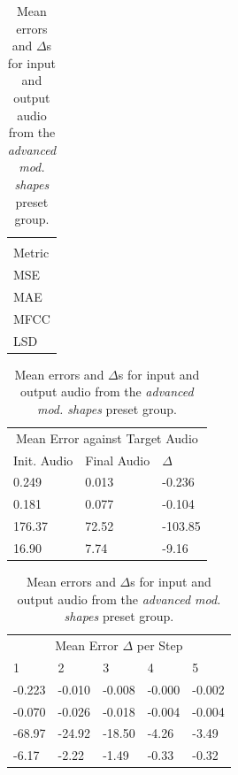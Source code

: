 \documentclass{article}
\begin{document}
\bigskip
\bigskip

\begin{table}[h]
  \caption{Mean errors and $\Delta$s for input and output audio from the \emph{advanced mod. shapes} preset group.}
  \centering
  \begin{tabular}{l}
    \toprule
    \multicolumn{1}{c}{} \\
    \cmidrule(r){1-1}
    Metric \\
    \midrule
    MSE \\
    MAE \\
    MFCC \\
    LSD \\
    \bottomrule
  \end{tabular}
  \begin{tabular}{lll}
    \toprule
    \multicolumn{3}{c}{Mean Error against Target Audio} \\
    \cmidrule(r){1-3}
    Init. Audio & Final Audio & $\Delta$ \\
    \midrule
    0.249 & 0.013 & -0.236 \\
    0.181 & 0.077 & -0.104 \\
    176.37 & 72.52 & -103.85 \\
    16.90 & 7.74 & -9.16 \\
    \bottomrule
  \end{tabular}
  \begin{tabular}{lllll}
    \toprule
    \multicolumn{5}{c}{Mean Error $\Delta$ per Step} \\
    \cmidrule(r){1-5}
    1 & 2 & 3 & 4 & 5 \\
    \midrule
    -0.223 & -0.010 & -0.008 & -0.000 & -0.002 \\
    -0.070 & -0.026 & -0.018 & -0.004 & -0.004 \\
    -68.97 & -24.92 & -18.50 & -4.26 & -3.49 \\
    -6.17 & -2.22 & -1.49 & -0.33 & -0.32 \\
    \bottomrule
  \end{tabular}
\end{table}
\end{document}
